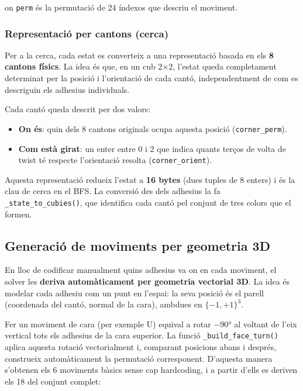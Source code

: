 \documentclass[12pt, a4paper]{article}
\begin{document}
on \texttt{perm} és la permutació de 24 índexos que descriu el moviment.

\subsubsection{Representació per cantons (cerca)}

Per a la cerca, cada estat es converteix a una representació basada en els \textbf{8 cantons físics}. La idea és que, en un cub 2$\times$2, l'estat queda completament determinat per la posició i l'orientació de cada cantó, independentment de com es descriguin els adhesius individuals.

Cada cantó queda descrit per dos valors:
\begin{itemize}
  \item \textbf{On és}: quin dels 8 cantons originals ocupa aquesta posició (\texttt{corner\_perm}).
  \item \textbf{Com està girat}: un enter entre 0 i 2 que indica quants terços de volta de twist té respecte l'orientació resolta (\texttt{corner\_orient}).
\end{itemize}

Aquesta representació redueix l'estat a \textbf{16 bytes} (dues tuples de 8 enters) i és la clau de cerca en el BFS. La conversió des dels adhesius la fa \texttt{\_state\_to\_cubies()}, que identifica cada cantó pel conjunt de tres colors que el formen.

\subsection{Generació de moviments per geometria 3D}

En lloc de codificar manualment quins adhesius va on en cada moviment, el solver les \textbf{deriva automàticament per geometria vectorial 3D}. La idea és modelar cada adhesiu com un punt en l'espai: la seva posició és el parell (coordenada del cantó, normal de la cara), ambdues en $\{-1, +1\}^3$.

Fer un moviment de cara (per exemple U) equival a rotar $-90°$ al voltant de l'eix vertical tots els adhesius de la cara superior. La funció \texttt{\_build\_face\_turn()} aplica aquesta rotació vectorialment i, comparant posicions abans i després, construeix automàticament la permutació corresponent. D'aquesta manera s'obtenen els 6 moviments bàsics sense cap hardcoding, i a partir d'ells es deriven els 18 del conjunt complet:
\end{document}
